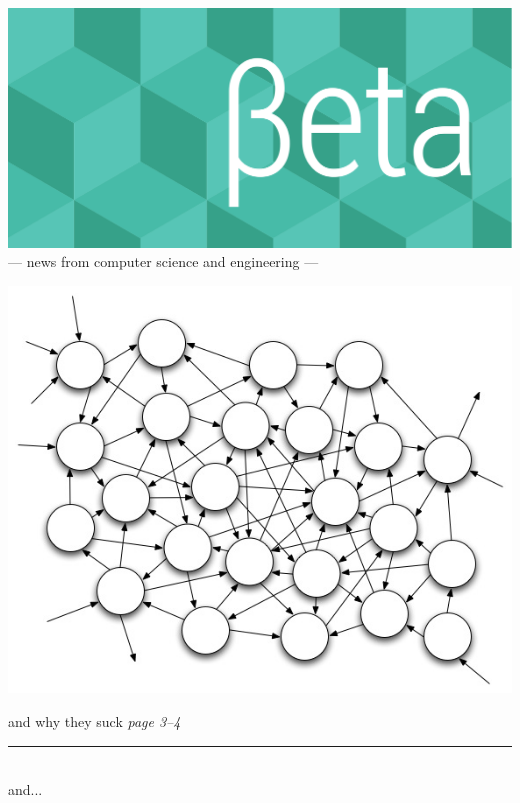\documentclass[twoside]{article}
\date{13 April 2015}
\begin{document}
\thispagestyle{empty}
\begingroup%
\vspace*{-3.5cm}\centering\hspace*{-2.8cm}%
\includegraphics[trim=0mm 20mm 0mm 0mm, clip, width=22cm]{../../style/beta-logo.pdf}%
\vspace{1em}
{\sffamily\fontsize{32pt}{32pt}\selectfont --- news from computer science and engineering ---}
\endgroup\vspace*{3ex}

\center
\includegraphics[trim=0mm 20mm 0mm 20mm, clip,width=\linewidth]{images/protocols-labels.jpg}

{\sffamily\fontsize{24pt}{24pt}\selectfont {\bfseries ``intuitive'' protocols} and why they suck}%
\hfill{\rmfamily\fontsize{14pt}{14pt}\selectfont\it page 3--4}
\endcenter

\vfill\center\rule[4pt]{0.75\linewidth}{0.75pt}\\ {\sffamily\fontsize{24pt}{24pt}\selectfont and...}\endcenter\vfill
\end{document}
